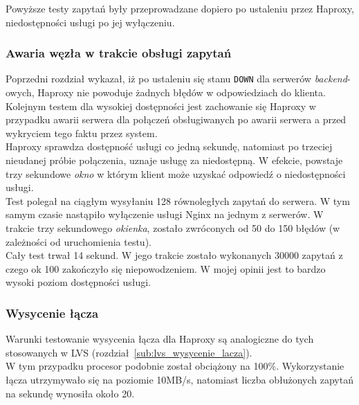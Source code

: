 Powyższe testy zapytań były przeprowadzane dopiero po ustaleniu przez Haproxy, niedostępności usługi po jej wyłączeniu.
\subsubsection*{Awaria węzła w trakcie obsługi zapytań}
Poprzedni rozdział wykazał, iż po ustaleniu się stanu \texttt{DOWN} dla serwerów \textit{backend}-owych, Haproxy nie powoduje żadnych błędów w odpowiedziach do klienta.\\
Kolejnym testem dla wysokiej dostępności jest zachowanie się Haproxy w przypadku awarii serwera dla połączeń obsługiwanych po awarii serwera a przed wykryciem tego faktu przez system.\\
Haproxy sprawdza dostępność usługi co jedną sekundę, natomiast po trzeciej nieudanej próbie połączenia, uznaje usługę za niedostępną.
W efekcie, powstaje trzy sekundowe \textit{okno} w którym klient może uzyskać odpowiedź o niedostępności usługi.\\
Test polegał na ciągłym wysyłaniu 128 równoległych zapytań do serwera.
W tym samym czasie nastąpiło wyłączenie usługi Nginx na jednym z serwerów.
W trakcie trzy sekundowego \textit{okienka}, zostało zwróconych od 50 do 150 błędów (w zależności od uruchomienia testu).\\
Cały test trwał 14 sekund. W jego trakcie zostało wykonanych 30000 zapytań z czego ok 100 zakończyło się niepowodzeniem.
W mojej opinii jest to bardzo wysoki poziom dostępności usługi.
\subsubsection*{Wysycenie łącza}
Warunki testowanie wysycenia łącza dla Haproxy są analogiczne do tych stosowanych w LVS (rozdział~\ref{sub:lvs_wysycenie_lacza}).\\
W tym przypadku procesor podobnie został obciążony na 100\%.
Wykorzystanie łącza utrzymywało się na poziomie 10MB/s, natomiast liczba obłużonych zapytań na sekundę wynosiła około 20.
